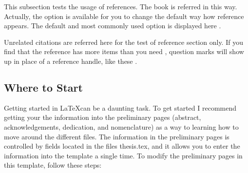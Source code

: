 This subsection tests the usage of references. The book\cite{REALCAR} is
referred in this way. Actually, the option is available for you to change the
default way how reference appears. The default and most commonly used option
\cite{einstein} is displayed here \cite{Barn-JORVQ}.

Unrelated citations are referred here for the test of reference section only. If
you find that the reference has more items than you need \cite{WAGFJ}, question
marks will show up in place of a reference handle, like these
\cite{a-reference-thats-not-in-your-bib-file}.

\subsection{Where to Start}

Getting started in \LaTeX can be a daunting task. To get started I recommend getting your the information into the
preliminary pages (abstract, acknowledgements, dedication, and nomenclature) as a way to learning how to move around
the different files. The information in the preliminary pages is controlled by fields located in
the files thesis.tex, and it allows you to enter the information into the template a single time. To modify
the preliminary pages in this template, follow these steps:

